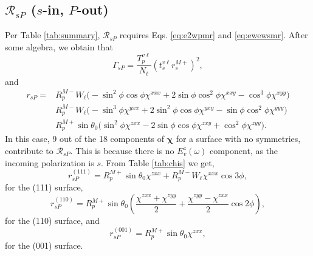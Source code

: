 
\subsection{\texorpdfstring{$\mathcal{R}_{sP}$ ($s$-in, $P$-out)}
{RsP (s-in, P-out)}}
\label{sec:RsP}

Per Table \ref{tab:summary}, $\mathcal{R}_{sP}$ requires Eqs. \eqref{eq:e2wpmr}
and \eqref{eq:ewewsmr}. After some algebra, we obtain that
\begin{equation}\label{mcv4}
\Gamma_{sP}=
\frac{T^{v\ell}_{p}}{N_{\ell}}
\left(t^{v\ell}_{s}r^{M+}_{s}\right)^{2},
\end{equation}
and
\begin{equation}
\begin{split}
r_{sP} = 
& R^{M-}_{p}W_{\ell}
\big(
- \sin^{2}\phi\cos\phi\chi^{xxx}
+ 2\sin\phi\cos^{2}\phi\chi^{xxy}
- \cos^{3}\phi\chi^{xyy}
\big)\\
& R^{M-}_{p}W_{\ell}
\big(
- \sin^{3}\phi\chi^{yxx}
+ 2\sin^{2}\phi\cos\phi\chi^{yxy}
- \sin\phi\cos^{2}\phi\chi^{yyy}
\big)\\
& R^{M+}_{p}\sin\theta_{0}
\big(
  \sin^{2}\phi\chi^{zxx}
- 2\sin\phi\cos\phi\chi^{zxy}
+ \cos^{2}\phi\chi^{zyy}
\big).
\end{split}
\end{equation}
In this case, 9 out of the 18 components of $\boldsymbol{\chi}$ for a surface
with no symmetries, contribute to $\mathcal{R}_{sP}$. This is because there is
no $E^{z}_{v}(\omega)$ component, as the incoming polarization is $s$. From
Table \ref{tab:chis} we get,
\begin{equation}\label{eq:rsp111}
r^{(111)}_{sP} = 
R^{M+}_{p}\sin\theta_{0}\chi^{zxx} +
R^{M-}_{p}W_{\ell}\chi^{xxx}\cos3\phi,
\end{equation}
for the (111) surface,
\begin{equation}\label{eq:rsp110}
r^{(110)}_{sP} = 
R^{M+}_{p}\sin\theta_{0}
\left(
\frac{\chi^{zxx} + \chi^{zyy}}{2} + \frac{\chi^{zyy} - \chi^{zxx}}{2}\cos2\phi
\right),
\end{equation}
for the (110) surface, and
\begin{equation}\label{eq:rsp001}
r^{(001)}_{sP} = R^{M+}_{p}\sin\theta_{0}\chi^{zxx},
\end{equation}
for the (001) surface.



